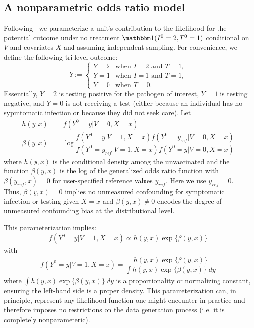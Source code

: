 \begin{appendix}
\section{A nonparametric odds ratio model}\label{sec:or_model}
Following \textcite{tchetgen_universal_2023}, we parameterize a unit's contribution to the likelihood for the potential outcome under no treatment $\mathbbm 1 (I^0 = 2, T^0 = 1)$ conditional on $V$ and covariates $X$ and assuming independent sampling. For convenience, we define the following tri-level outcome:
$$Y := \begin{cases} 
        Y = 2 & \text{when } I = 2 \text{ and } T = 1, \\
        Y = 1 & \text{when } I = 1 \text{ and } T = 1, \\
        Y = 0 & \text{when } T = 0.
        \end{cases}$$
Essentially, $Y=2$ is testing positive for the pathogen of interest, $Y=1$ is testing negative, and $Y=0$ is not receiving a test (either because an individual has no sypmtomatic infection or because they did not seek care). Let
\begin{align*}
    h(y, x) &= f(Y^0 = y | V = 0, X = x) \\
    \beta(y,  x) &= \log \dfrac{f(Y^0 = y | V = 1, X = x)f(Y^0 = y_{ref} | V = 0, X = x)}{f(Y^0 = y_{ref} | V = 1, X = x)f(Y^0 = y | V = 0, X = x)}
\end{align*}
where $h(y, x) $ is the conditional density among the unvaccinated and the function $ \beta(y,  x)$ is the log of the generalized odds ratio function with $\beta(y_{ref},  x) = 0$ for user-specified reference values $y_{ref}$. Here we use $y_{ref} = 0$. Thus, $\beta(y,  x) = 0$ implies no unmeasured confounding for symptomatic infection or testing given $X = x$ and $\beta(y,  x) \neq 0$ encodes the degree of unmeasured confounding bias at the distributional level. 

This parameterization implies:
\begin{align*}
    f(Y^0 = y | V = 1, X = x) \propto h(y, x) \exp\{\beta(y, x)\}
\end{align*}
with 
\begin{align*}
    f(Y^0 = y | V = 1, X = x)  = \dfrac{h(y, x) \exp\{\beta(y, x)\}}{\int h(y, x) \exp\{\beta(y, x)\} \;dy}
\end{align*}
where $\int h(y, x) \exp\{\beta(y, x)\} \;dy$ is a proportionality or normalizing constant, ensuring the left-hand side is a proper density. This parameterization can, in principle, represent any likelihood function one might encounter in practice and therefore imposes no restrictions on the data generation process (i.e. it is completely nonparameteric). 


\end{appendix}
